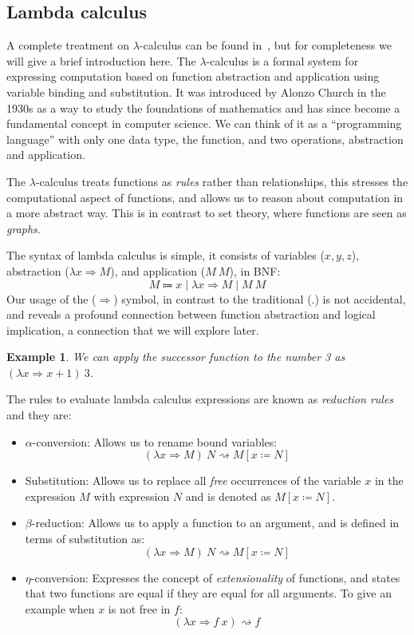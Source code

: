 \documentclass[
  a4paper, 
  10pt, 
  parskip=half, 
  DIV=20,
  toc=bibliography,
  usegeometry,
]{scrartcl}
\newtheorem{example}[theorem]{Example}
\renewcommand{\mapsto}{\Rightarrow}
\begin{document}
\subsection{Lambda calculus}

A complete treatment on \(\lambda\)-calculus can be found in~\cite{barendregt1984lambda}, 
but for completeness we will give a brief introduction here.
The \(\lambda\)-calculus is a formal system for expressing computation based on function abstraction 
and application using variable binding and substitution. It was introduced by 
Alonzo Church in the 1930s as a way to study the foundations of mathematics and 
has since become a fundamental concept in computer science. We can think of
it as a \enquote{programming language} with only one data type, the function, and
two operations, abstraction and application.

The \(\lambda\)-calculus treats functions as \emph{rules} rather than
relationships, this stresses the computational aspect of functions, and allows
us to reason about computation in a more abstract way. This is in contrast to
set theory, where functions are seen as \emph{graphs}.

The syntax of lambda calculus is simple, it consists of variables (\(x, y, z\)),
abstraction (\(\lambda x \mapsto M\)), and application (\(M \ M\)), in 
BNF:
\[
  M \Coloneqq x \mid \lambda x \mapsto M \mid M \ M
\]
Our usage of the (\(\mapsto\)) symbol, in contrast to the traditional (\(.\))
is not accidental, and reveals a profound connection between function abstraction
and logical implication, a connection that we will explore later.

\begin{example}\label{ex:lambda_expr}
We can apply the successor function to the number 3 as
\(
(\lambda x \mapsto x + 1) \ 3
\).
\end{example}

The rules to evaluate lambda calculus expressions are known as
\emph{reduction rules} and they are:
\begin{itemize}
  \item \(\alpha\)-conversion: Allows us to rename bound variables:
    \[(\lambda x \mapsto M) \ N \rightsquigarrow M[x \coloneqq N]\]
  \item Substitution: Allows us to replace all \emph{free} occurrences of the 
  variable \(x\) in the expression \(M\) with expression \(N\) and is denoted as
  \(M[x \coloneqq N]\).
  \item \(\beta\)-reduction: Allows us to apply a function to an argument, and
    is defined in terms of substitution as:
    \[(\lambda x \mapsto M) \ N \rightsquigarrow M[x \coloneqq N]\]
  \item \(\eta\)-conversion: Expresses the concept of \emph{extensionality} of functions, 
    and states that two functions are equal if they are equal for all arguments.
    To give an example when \(x\) is not free in \(f\):
    \[(\lambda x \mapsto f \ x) \rightsquigarrow f\]
\end{itemize}
\end{document}

